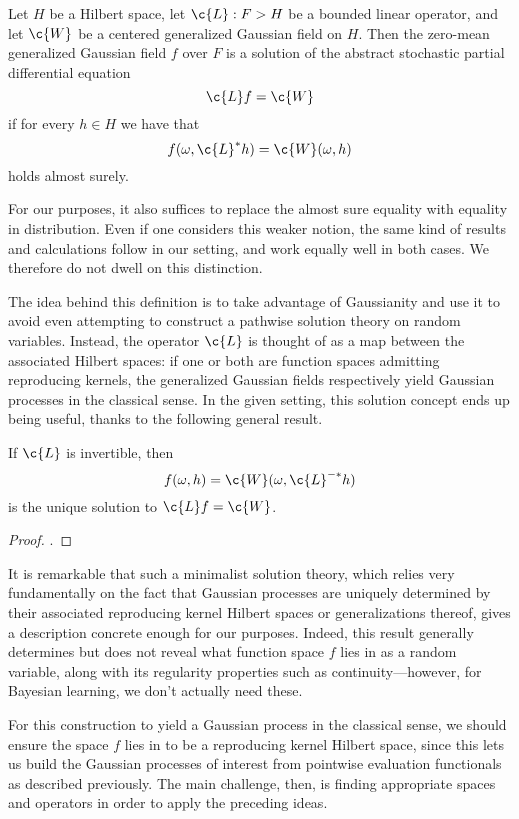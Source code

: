 \documentclass[11pt]{book}
\begin{document}
\begin{definition}
Let $H$ be a Hilbert space, let $\c{L} : F \-> H$ be a bounded linear operator, and let $\c{W}$ be a centered generalized Gaussian field on $H$.
Then the zero-mean generalized Gaussian field $f$ over $F$ is a solution of the abstract stochastic partial differential equation 
\[
\c{L} f = \c{W}    
\]
if for every $h\in H$ we have that 
\[
f(\omega,\c{L}^* h) = \c{W}(\omega,h)
\]
holds almost surely.
\end{definition}

For our purposes, it also suffices to replace the almost sure equality with equality in distribution. 
Even if one considers this weaker notion, the same kind of results and calculations follow in our setting, and work equally well in both cases.
We therefore do not dwell on this distinction.

The idea behind this definition is to take advantage of Gaussianity and use it to avoid even attempting to construct a pathwise solution theory on random variables.
Instead, the operator $\c{L}$ is thought of as a map between the associated Hilbert spaces: if one or both are function spaces admitting reproducing kernels, the generalized Gaussian fields respectively yield Gaussian processes in the classical sense.
In the given setting, this solution concept ends up being useful, thanks to the following general result.

\begin{result}
If $\c{L}$ is invertible, then
\[
f(\omega,h) = \c{W}(\omega, \c{L}^{-*} h)
\]
is the unique solution to $\c{L}f = \c{W}$.
\end{result}

\begin{proof}
\textcite[Theorem 4.2.2.]{lototsky17}.
\end{proof}

It is remarkable that such a minimalist solution theory, which relies very fundamentally on the fact that Gaussian processes are uniquely determined by their associated reproducing kernel Hilbert spaces or generalizations thereof, gives a description concrete enough for our purposes.
Indeed, this result generally determines but does not reveal what function space $f$ lies in as a random variable, along with its regularity properties such as continuity---however, for Bayesian learning, we don't actually need these.

For this construction to yield a Gaussian process in the classical sense, we should ensure the space $f$ lies in to be a reproducing kernel Hilbert space, since this lets us build the Gaussian processes of interest from pointwise evaluation functionals as described previously.
The main challenge, then, is finding appropriate spaces and operators in order to apply the preceding ideas.
\end{document}
